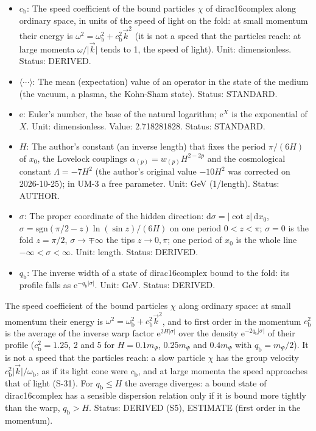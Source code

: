 \documentclass[
  10pt,
]{article}
\providecommand{\tightlist}{%
  \setlength{\itemsep}{0pt}\setlength{\parskip}{0pt}}
\begin{document}
\begin{itemize}
\tightlist
\item
  \(c_{\mathrm{b}}\): The speed coefficient of the bound particles
  \(\chi\) of dirac16complex along ordinary space, in units of the speed
  of light on the fold: at small momentum their energy is
  \(\omega^2 = \omega_{\mathrm{b}}^2 + c_{\mathrm{b}}^2\vec k^2\) (it is
  not a speed that the particles reach: at large momenta
  \(\omega/\lvert\vec k\rvert\) tends to 1, the speed of light). Unit:
  dimensionless. Status: DERIVED.
\item
  \(\langle\cdots\rangle\): The mean (expectation) value of an operator
  in the state of the medium (the vacuum, a plasma, the Kohn-Sham
  state). Status: STANDARD.
\item
  \(\mathrm{e}\): Euler's number, the base of the natural logarithm;
  \(\mathrm{e}^{X}\) is the exponential of \(X\). Unit: dimensionless.
  Value: 2.718281828. Status: STANDARD.
\item
  \(H\): The author's constant (an inverse length) that fixes the period
  \(\pi/(6H)\) of \(x_0\), the Lovelock couplings
  \(\alpha_{(p)} = w_{(p)}H^{2-2p}\) and the cosmological constant
  \(\Lambda = -7H^2\) (the author's original value \(-10H^2\) was
  corrected on 2026-10-25); in UM-3 a free parameter. Unit: GeV
  (1/length). Status: AUTHOR.
\item
  \(\sigma\): The proper coordinate of the hidden direction:
  \(\mathrm{d}\sigma = \lvert\cot z\rvert\,\mathrm{d}x_0\),
  \(\sigma = \mathrm{sgn}(\pi/2 - z)\ln(\sin z)/(6H)\) on one period
  \(0 < z < \pi\); \(\sigma = 0\) is the fold \(z = \pi/2\),
  \(\sigma \to \mp\infty\) the tips \(z \to 0, \pi\); one period of
  \(x_0\) is the whole line \(-\infty < \sigma < \infty\). Unit: length.
  Status: DERIVED.
\item
  \(q_{\mathrm{b}}\): The inverse width of a state of dirac16complex
  bound to the fold: its profile falls as
  \(\mathrm{e}^{-q_{\mathrm{b}}\lvert\sigma\rvert}\). Unit: GeV. Status:
  DERIVED.
\end{itemize}

The speed coefficient of the bound particles \(\chi\) along ordinary
space: at small momentum their energy is
\(\omega^2 = \omega_{\mathrm{b}}^2 + c_{\mathrm{b}}^2\vec k^2\), and to
first order in the momentum \(c_{\mathrm{b}}^2\) is the average of the
inverse warp factor \(\mathrm{e}^{2H\lvert\sigma\rvert}\) over the
density \(\mathrm{e}^{-2q_{\mathrm{b}}\lvert\sigma\rvert}\) of their
profile (\(c_{\mathrm{b}}^2 = 1.25\), 2 and 5 for \(H = 0.1m_\Psi\),
\(0.25m_\Psi\) and \(0.4m_\Psi\) with \(q_{\mathrm{b}} = m_\Psi/2\)). It
is not a speed that the particles reach: a slow particle \(\chi\) has
the group velocity
\(c_{\mathrm{b}}^2\lvert\vec k\rvert/\omega_{\mathrm{b}}\), as if its
light cone were \(c_{\mathrm{b}}\), and at large momenta the speed
approaches that of light (S-31). For \(q_{\mathrm{b}} \le H\) the
average diverges: a bound state of dirac16complex has a sensible
dispersion relation only if it is bound more tightly than the warp,
\(q_{\mathrm{b}} > H\). Status: DERIVED (S5), ESTIMATE (first order in
the momentum).
\end{document}
